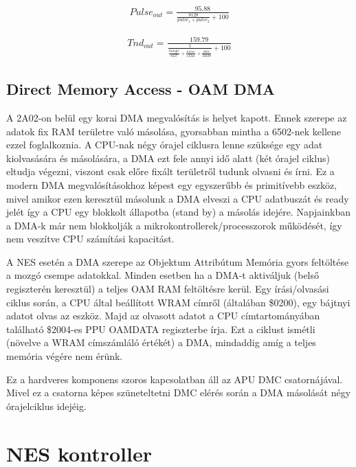 	\begin{align}
		\label{mat:APU-nonlin-2}
		Pulse_{out} = \frac{95.88}{\frac{8128}{pulse_1 + pulse_2} + 100}
	\end{align}
	
	\begin{align}
		\label{mat:APU-nonlin-3}
		Tnd_{out} = \frac{159.79}{\frac{1}{\frac{tiangle}{8227} + \frac{noise}{12241} + \frac{dmc}{22638}} + 100}
	\end{align}

	\subsection{Direct Memory Access - OAM DMA}
	\label{sec:DMA}
	
	A 2A02-on belül egy korai DMA megvalósítás is helyet kapott. Ennek szerepe az adatok fix RAM területre való másolása, gyorsabban mintha a 6502-nek kellene ezzel foglalkoznia. A CPU-nak négy órajel ciklusra lenne szüksége egy adat kiolvasására és másolására, a DMA ezt fele annyi idő alatt (két órajel ciklus) eltudja végezni, viszont csak előre fixált területről tudunk olvasni és írni. Ez a modern DMA megvalósításokhoz képest egy egyszerűbb és primitívebb eszköz, mivel amikor ezen keresztül másolunk a DMA elveszi a CPU adatbuszát és ready jelét így a CPU egy blokkolt állapotba (stand by) a másolás idejére. Napjainkban a DMA-k már nem blokkolják a mikrokontrollerek/processzorok működését, így nem veszítve CPU számítási kapacitást.
	
	A NES esetén a DMA szerepe az Objektum Attribútum Memória gyors feltöltése a mozgó csempe adatokkal. Minden esetben ha a DMA-t aktiváljuk (belső regiszterén keresztül) a teljes OAM RAM feltöltésre kerül. Egy írási/olvasási ciklus során, a CPU által beállított WRAM címről (általában \$0200), egy bájtnyi adatot olvas az eszköz. Majd az olvasott adatot a CPU címtartományában található \$2004-es PPU OAMDATA regiszterbe írja. Ezt a ciklust ismétli (növelve a WRAM címszámláló értékét) a DMA, mindaddig amíg a teljes memória végére nem érünk.
	
	Ez a hardveres komponens szoros kapcsolatban áll az APU DMC csatornájával. Mivel ez a csatorna képes szüneteltetni DMC elérés során a DMA másolását négy órajelciklus idejéig.  
	
\section{NES kontroller}

